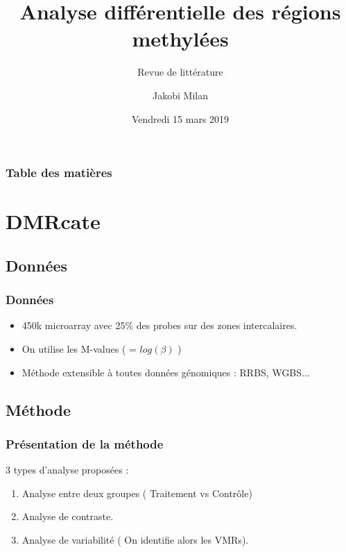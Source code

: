 \documentclass{beamer}
\begin{document}
\title[identification DMRs] %
{Analyse différentielle des régions methylées}
\subtitle{Revue de littérature}
\author{Jakobi Milan}
\date[KPT 2004]{Vendredi 15 mars 2019}






\frame{\titlepage}

\begin{frame}
\frametitle{Table des matières}
\tableofcontents
\end{frame}


\section{DMRcate}
\subsection{Données}

\begin{frame}
\frametitle{Données}
\begin{itemize}
\item<1-> 450k microarray avec 25\% des probes sur des zones intercalaires.
\item<1-> On utilise les M-values ( = $log(\beta)$ )
\item<2-> Méthode extensible à toutes données génomiques : RRBS, WGBS...

\end{itemize}
\end{frame}

\subsection{Méthode}
\begin{frame}
\frametitle{Présentation de la méthode}
3 types d'analyse proposées :
\begin{enumerate}
\item<2-> Analyse entre deux groupes ( Traitement vs Contrôle)
\item<2-> Analyse de contraste.
\item<2-> Analyse de variabilité ( On identifie alors les VMRs).
\end{enumerate}
\end{frame}
\end{document}
